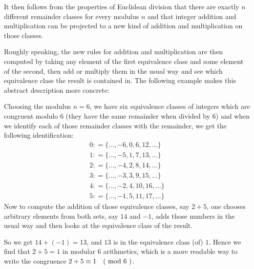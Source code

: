 It then follows from the properties of Euclidean division that there are exactly $ n $ different remainder classes for every modulus $n$ and that integer addition and multiplication can be projected to a new kind of addition and multiplication on those classes. 

Roughly speaking, the new rules for addition and multiplication are then computed by taking any element of the first equivalence class and some element of the second, then add or multiply them in the usual way and see which equivalence class the result is contained in.
The following example makes this abstract description more concrete:
\begin{example} 
\label{def_residue_ring_z_6}
Choosing the modulus $ n = 6 $, we have six equivalence classes of integers which are congruent modulo $ 6 $ (they have the same remainder when divided by $6$) and when we identify each of those remainder classes with the remainder, we get the following identification:
$$
\begin{array}{l}
0: = \{\ldots, -6,0,6,12, \ldots \}\\
1: = \{\ldots, -5,1,7,13, \ldots \}\\
2: = \{\ldots, -4,2,8,14, \ldots \} \\
3: = \{\ldots, -3,3,9,15, \ldots \}\\
4: = \{\ldots, -2,4,10,16, \ldots \}\\
5: = \{\ldots, -1,5,11,17, \ldots \}
\end{array}
$$
Now to compute the addition of those equivalence classes, say $2+5$, one chooses arbitrary elements from both sets, say $14$ and $-1$, adds those numbers in the usual way and then looks at the equivalence class of the result. 

So we get $14+(-1)=13$, and $13$ is in the equivalence class (of) $1$. Hence we find that $2+5=1$ in modular $6$ arithmetics, which is a more readable way to write the congruence $2+5 \equiv 1 \quad \text{( mod } 6 \text{ )}$.


\end{example}
